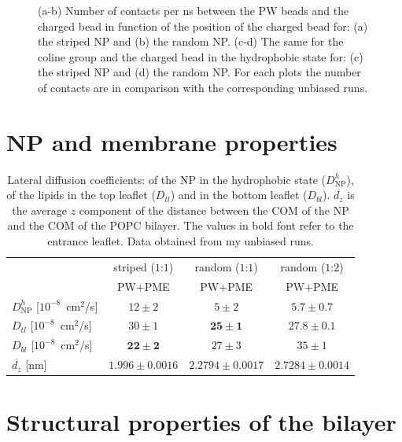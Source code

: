 \begin{figure}[p]
\begin{adjustwidth}{-0.5cm}{-1.5cm}
{		}
		\caption{(a-b) Number of contacts per ns between the \acs{PW} beads and the charged bead in function of the position of the charged bead for: (a) the striped \acs{NP} and (b) the random \acs{NP}. (c-d) The same for the coline group and the charged bead  in the hydrophobic state for: (c) the striped \ac{NP} and (d) the random \acs{NP}. For each plots the number of contacts are in comparison with the corresponding unbiased runs.}
		\label{fig:contactsUn}
	\end{adjustwidth}
\end{figure}


\section{NP and membrane properties}

\begin{table}[h!t]
	\centering
	\begin{tabular}{lccc}
		\toprule
		\,		& striped ($1$:$1$)		& random ($1$:$1$)		& random ($1$:$2$)		\\
		\,		& \acs{PW}$+$\acs{PME} & \acs{PW}$+$\acs{PME} & \acs{PW}$+$\acs{PME}	\\ \toprule
		$D^h_{\text{NP}}$ [$10^{-8}$~cm$^2$/s] & $12 \pm 2$ & $5 \pm 2$ & $5.7 \pm 0.7$ 			\\ \midrule
		$D_{tl}$ [$10^{-8}$~cm$^2$/s] & $30 \pm 1$ & $\mathbf{25 \pm 1}$ & $\mathbf{27.8 \pm 0.1}$	\\ \midrule
		$D_{bl}$ [$10^{-8}$~cm$^2$/s] & $\mathbf{22 \pm 2}$ & $27 \pm 3$	& $35 \pm 1$			\\ \midrule
		$\overline{d_z}$ [nm] & $1.996 \pm 0.0016$	& $2.2794 \pm 0.0017$	& $2.7284 \pm 0.0014$	\\ \bottomrule
	\end{tabular}
	\caption{Lateral diffusion coefficients: of the \acs{NP} in the hydrophobic state ($D^h_\text{NP}$), of the lipids in the top leaflet ($D_{tl}$) and in the bottom leaflet ($D_{bl}$). $\overline{d_z}$ is the average $z$ component of the distance between the \acs{COM} of the \acs{NP} and the \acs{COM} of the \acs{POPC} bilayer. The values in bold font refer to the entrance leaflet. Data obtained from my unbiased runs.}
	\label{tab:NPMembProperties}
\end{table}


\section{Structural properties of the bilayer}
